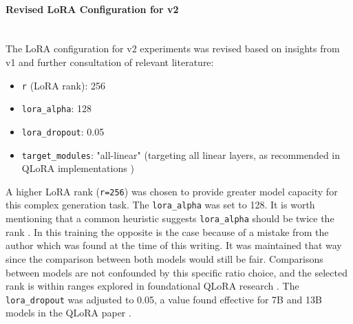 \paragraph{Revised LoRA Configuration for v2} \mbox{}\\
The LoRA configuration for v2 experiments was revised based on insights from v1 and further consultation of relevant literature:
\begin{itemize}
    \item \texttt{r} (LoRA rank): 256
    \item \texttt{lora\_alpha}: 128
    \item \texttt{lora\_dropout}: 0.05
    \item \texttt{target\_modules}: "all-linear" (targeting all linear layers, as recommended in QLoRA implementations \cite{artidoro_qlora_2023})
\end{itemize}
A higher LoRA rank (\texttt{r=256}) was chosen to provide greater model capacity for this complex generation task. 
The \texttt{lora\_alpha} was set to 128. 
It is worth mentioning that a common heuristic suggests \texttt{lora\_alpha} should be twice the rank \cite{Raschka2023PracticalTips}.
In this training the opposite is the case because of a mistake from the author which was found at the time of this writing.
It was maintained that way since the comparison between both models would still be fair. 
Comparisons between models are not confounded by this specific ratio choice, and the selected rank is within ranges explored in foundational QLoRA research \cite{dettmers2023qlora}. 
The \texttt{lora\_dropout} was adjusted to 0.05, a value found effective for 7B and 13B models in the QLoRA paper \cite{dettmers2023qlora}.


